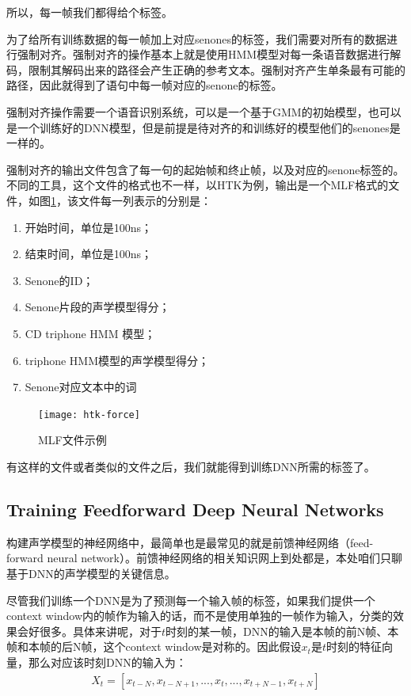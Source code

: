 所以，每一帧我们都得给个标签。

为了给所有训练数据的每一帧加上对应senones的标签，我们需要对所有的数据进行强制对齐。强制对齐的操作基本上就是使用HMM模型对每一条语音数据进行解码，限制其解码出来的路径会产生正确的参考文本。强制对齐产生单条最有可能的路径，因此就得到了语句中每一帧对应的senone的标签。

强制对齐操作需要一个语音识别系统，可以是一个基于GMM的初始模型，也可以是一个训练好的DNN模型，但是前提是待对齐的和训练好的模型他们的senones是一样的。

强制对齐的输出文件包含了每一句的起始帧和终止帧，以及对应的senone标签的。不同的工具，这个文件的格式也不一样，以HTK为例，输出是一个MLF格式的文件，如图\ref{fig:htk-force}，该文件每一列表示的分别是：
\begin{enumerate}
	\item 开始时间，单位是100ns；
	\item 结束时间，单位是100ns；
	\item Senone的ID；
	\item Senone片段的声学模型得分；
	\item CD triphone HMM 模型；
	\item triphone HMM模型的声学模型得分；
	\item Senone对应文本中的词
\end{enumerate}

\begin{figure}[htbp]
	\centering
	\texttt{[image: htk-force]}
	\caption{MLF文件示例\label{fig:htk-force}}
\end{figure}

有这样的文件或者类似的文件之后，我们就能得到训练DNN所需的标签了。

\subsection{Training Feedforward Deep Neural Networks} 
构建声学模型的神经网络中，最简单也是最常见的就是前馈神经网络（feed-forward neural network）。前馈神经网络的相关知识网上到处都是，本处咱们只聊基于DNN的声学模型的关键信息。

尽管我们训练一个DNN是为了预测每一个输入帧的标签，如果我们提供一个context window内的帧作为输入的话，而不是使用单独的一帧作为输入，分类的效果会好很多。具体来讲呢，对于$t$时刻的某一帧，DNN的输入是本帧的前N帧、本帧和本帧的后N帧，这个context window是对称的。因此假设$x_t$是$t$时刻的特征向量，那么对应该时刻DNN的输入为：
\begin{align} 
	X_{t} = [x_{t-N}, x_{t-N+1}, ..., x_{t}, ..., x_{t+N-1}, x_{t+N}]
\end{align}

